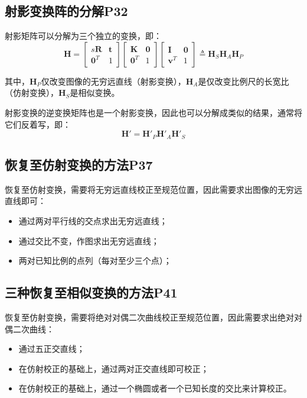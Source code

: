 \documentclass[11pt]{article}
\begin{document}
\subsection{	射影变换阵的分解P32}
射影矩阵可以分解为三个独立的变换，即：
\begin{equation*}
  \mathbold{H}=\begin{bmatrix}
    s\mathbold{R}  & \mathbold{t} \\
    \mathbold{0}^T & 1
  \end{bmatrix}
  \begin{bmatrix}
    \mathbold{K}   & \mathbold{0} \\
    \mathbold{0}^T & 1
  \end{bmatrix}
  \begin{bmatrix}
    \mathbold{I}   & \mathbold{0} \\
    \mathbold{v}^T & 1
  \end{bmatrix}
  \triangleq\mathbold{H}_S\mathbold{H}_A\mathbold{H}_P
\end{equation*}\par
其中，$\mathbold{H}_P$仅改变图像的无穷远直线（射影变换），$\mathbold{H}_A$是仅改变比例尺的长宽比（仿射变换），$\mathbold{H}_S$是相似变换。\par
射影变换的逆变换矩阵也是一个射影变换，因此也可以分解成类似的结果，通常将它们反着写，即：
\begin{equation*}
  \mathbold{H}'=\mathbold{H}'_P\mathbold{H}'_A\mathbold{H}'_S
\end{equation*}\par
\subsection{恢复至仿射变换的方法P37}
恢复至仿射变换，需要将无穷远直线校正至规范位置，因此需要求出图像的无穷远直线即可：
\begin{itemize}
  \item 通过两对平行线的交点求出无穷远直线；
  \item 通过交比不变，作图求出无穷远直线；
  \item 两对已知比例的点列（每对至少三个点）；
\end{itemize}
\subsection{三种恢复至相似变换的方法P41}
恢复至仿射变换，需要将绝对对偶二次曲线校正至规范位置，因此需要求出绝对对偶二次曲线：
\begin{itemize}
  \item 通过五正交直线；
  \item 在仿射校正的基础上，通过两对正交直线即可校正；
  \item 在仿射校正的基础上，通过一个椭圆或者一个已知长度的交比来计算校正。
\end{itemize}
\end{document}

